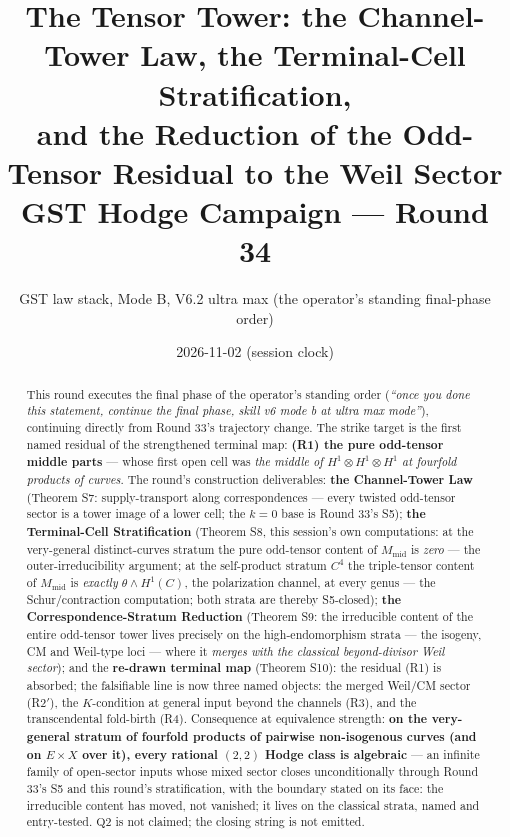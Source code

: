 \documentclass[11pt]{article}
\title{The Tensor Tower: the Channel-Tower Law, the Terminal-Cell Stratification,\\ and the Reduction of the Odd-Tensor Residual to the Weil Sector\\[6pt]
\large GST Hodge Campaign --- Round 34}
\author{GST law stack, Mode B, V6.2 ultra max (the operator's standing final-phase order)}
\date{2026-11-02 (session clock)}
\begin{document}
\maketitle

\begin{abstract}
This round executes the final phase of the operator's standing order
(\emph{``once you done this statement, continue the final phase, skill v6
mode b at ultra max mode''}), continuing directly from Round 33's
trajectory change. The strike target is the first named residual of the
strengthened terminal map: \textbf{(R1) the pure odd-tensor middle parts}
--- whose first open cell was \emph{the middle of
$H^{1}\otimes H^{1}\otimes H^{1}$ at fourfold products of curves}. The
round's construction deliverables:
\textbf{the Channel-Tower Law} (Theorem S7: supply-transport along
correspondences --- every twisted odd-tensor sector is a tower image of a
lower cell; the $k=0$ base is Round 33's S5);
\textbf{the Terminal-Cell Stratification} (Theorem S8, this session's own
computations: at the very-general distinct-curves stratum the pure
odd-tensor content of $M_{\mathrm{mid}}$ is \emph{zero} --- the
outer-irreducibility argument; at the self-product stratum
$C^{4}$ the triple-tensor content of $M_{\mathrm{mid}}$ is
\emph{exactly} $\theta\wedge H^{1}(C)$, the polarization channel,
at every genus --- the Schur/contraction computation; both strata are
thereby S5-closed);
\textbf{the Correspondence-Stratum Reduction} (Theorem S9: the
irreducible content of the entire odd-tensor tower lives precisely on the
high-endomorphism strata --- the isogeny, CM and Weil-type loci --- where
it \emph{merges with the classical beyond-divisor Weil sector}); and the
\textbf{re-drawn terminal map} (Theorem S10): the residual (R1) is
absorbed; the falsifiable line is now three named objects: the merged
Weil/CM sector (R2$'$), the $K$-condition at general input beyond the
channels (R3), and the transcendental fold-birth (R4).
Consequence at equivalence strength: \textbf{on the very-general stratum
of fourfold products of pairwise non-isogenous curves (and on
$E\times X$ over it), every rational $(2,2)$ Hodge class is algebraic}
--- an infinite family of open-sector inputs whose mixed sector closes
unconditionally through Round 33's S5 and this round's stratification, with
the boundary stated on its face: the irreducible content has moved, not
vanished; it lives on the classical strata, named and entry-tested.
$\mathrm{Q2}$ is not claimed; the closing string is not emitted.
\end{abstract}
\end{document}
